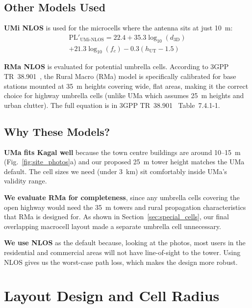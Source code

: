 \documentclass[10pt,a4paper,twocolumn]{article}
\begin{document}
\subsection{Other Models Used}

\textbf{UMi NLOS} is used for the microcells where the antenna sits at just 10~m:
\begin{multline}
\text{PL}'_{\text{UMi-NLOS}} = 22.4 + 35.3\log_{10}(d_{3\text{D}}) \\
+ 21.3\log_{10}(f_c) - 0.3(h_{\text{UT}} - 1.5)
\end{multline}

\textbf{RMa NLOS} is evaluated for potential umbrella cells. According to 3GPP TR~38.901~\cite{3gpp_38901}, the Rural Macro (RMa) model is specifically calibrated for base stations mounted at 35~m heights covering wide, flat areas, making it the correct choice for highway umbrella cells (unlike UMa which assumes 25~m heights and urban clutter). The full equation is in 3GPP TR~38.901~\cite{3gpp_38901} Table~7.4.1-1.

\subsection{Why These Models?}

\textbf{UMa fits Kagal well} because the town centre buildings are around 10--15~m (Fig.~\ref{fig:site_photos}a) and our proposed 25~m tower height matches the UMa default. The cell sizes we need (under 3~km) sit comfortably inside UMa's validity range.

\textbf{We evaluate RMa for completeness}, since any umbrella cells covering the open highway would need the 35~m towers and rural propagation characteristics that RMa is designed for. As shown in Section~\ref{sec:special_cells}, our final overlapping macrocell layout made a separate umbrella cell unnecessary.

\textbf{We use NLOS} as the default because, looking at the photos, most users in the residential and commercial areas will not have line-of-sight to the tower. Using NLOS gives us the worst-case path loss, which makes the design more robust.

\section{Layout Design and Cell Radius}
\label{sec:design}
\end{document}
